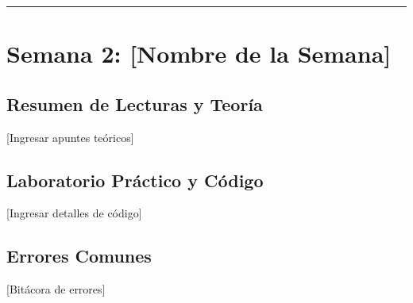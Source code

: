 \documentclass[11pt, a4paper]{article}
\begin{document}
\noindent\rule{\textwidth}{0.4pt}
\newpage

\section{Semana 2: [Nombre de la Semana]}
\subsection{Resumen de Lecturas y Teoría}
[Ingresar apuntes teóricos]

\subsection{Laboratorio Práctico y Código}
[Ingresar detalles de código]

\subsection{Errores Comunes}
[Bitácora de errores]
\end{document}
